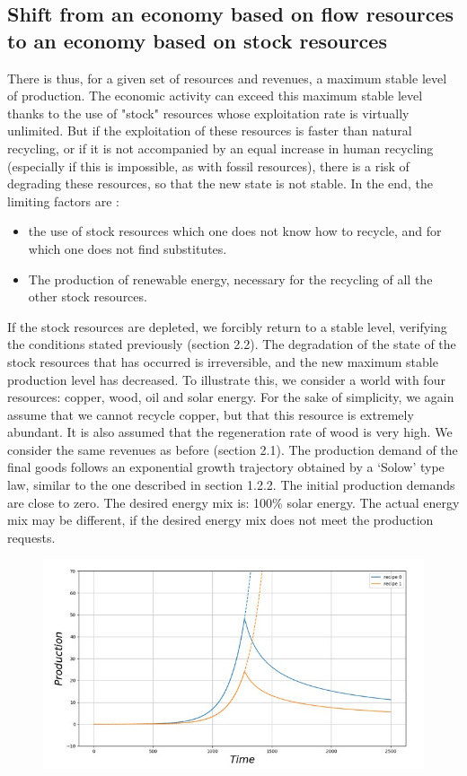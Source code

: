 \documentclass[12pt,a4paper]{article}%
\begin{document}
\begin{appendix}
\subsection{Shift from an economy based on flow resources to an economy based on stock resources} 
There is thus, for a given set of resources and revenues, a maximum stable level of production. The economic activity can exceed this maximum stable level thanks to the use of "stock" resources whose exploitation rate is virtually unlimited. But if the exploitation of these resources is faster than natural recycling, or if it is not accompanied by an equal increase in human recycling (especially if this is impossible, as with fossil resources), there is a risk of degrading these resources, so that the new state is not stable.  In the end, the limiting factors are :  
\begin{itemize}
	\item the use of stock resources which one does not know how to recycle, and for which one does not find substitutes.  
	\item The production of renewable energy, necessary for the recycling of all the other stock resources. 
\end{itemize} If the stock resources are depleted, we forcibly return to a stable level, verifying the conditions stated previously (section 2.2). The degradation of the state of the stock resources that has occurred is irreversible, and the new maximum stable production level has decreased.  To illustrate this, we consider a world with four resources: copper, wood, oil and solar energy. For the sake of simplicity, we again assume that we cannot recycle copper, but that this resource is extremely abundant. It is also assumed that the regeneration rate of wood is very high.  We consider the same revenues as before (section 2.1). The production demand of the final goods follows an exponential growth trajectory obtained by a `Solow' type law, similar to the one described in section 1.2.2. The initial production demands are close to zero.  The desired energy mix is: 100\% solar energy. The actual energy mix may be different, if the desired energy mix does not meet the production requests.  
\begin{figure}[h] 
	\centering \includegraphics[width=1.0\textwidth]{figures/Production11.jpg}

\end{figure}
\end{appendix}
\end{document}
